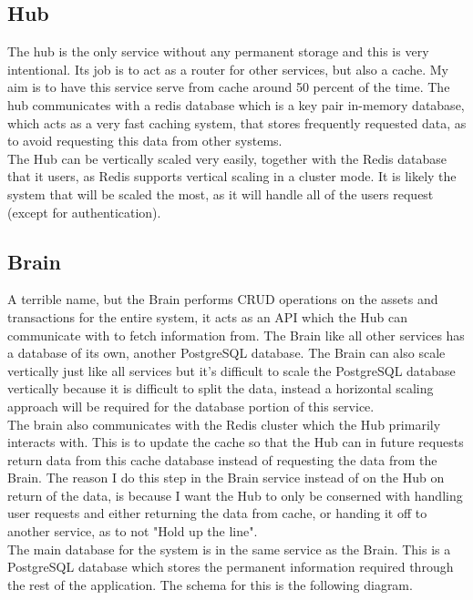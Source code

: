 \documentclass[titlepage]{article}
\begin{document}
\subsection{Hub}
The hub is the only service without any permanent storage and this is very intentional. Its job is to act as a router for other services, but also a cache. My aim is to have this service serve from cache around 50 percent of the time. The hub communicates with a redis database which is a key pair in-memory database, which acts as a very fast caching system, that stores frequently requested data, as to avoid requesting this data from other systems. \\

The Hub can be vertically scaled very easily, together with the Redis database that it users, as Redis supports vertical scaling in a cluster mode. It is likely the system that will be scaled the most, as it will handle all of the users request (except for authentication).

\subsection{Brain}
A terrible name, but the Brain performs CRUD operations on the assets and transactions for the entire system, it acts as an API which the Hub can communicate with to fetch information from. The Brain like all other services has a database of its own, another PostgreSQL database. The Brain can also scale vertically just like all services but it's difficult to scale the PostgreSQL database vertically because it is difficult to split the data, instead a horizontal scaling approach will be required for the database portion of this service. \\

The brain also communicates with the Redis cluster which the Hub primarily interacts with. This is to update the cache so that the Hub can in future requests return data from this cache database instead of requesting the data from the Brain. The reason I do this step in the Brain service instead of on the Hub on return of the data, is because I want the Hub to only be conserned with handling user requests and either returning the data from cache, or handing it off to another service, as to not "Hold up the line". \\

The main database for the system is in the same service as the Brain. This is a PostgreSQL database which stores the permanent information required through the rest of the application. The schema for this is the following diagram. \\
\end{document}
